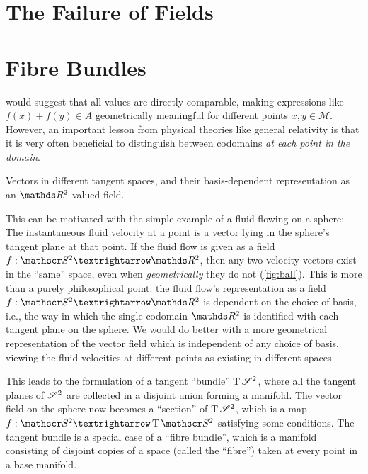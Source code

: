 \chapter{The Failure of Fields}







\chapter{Fibre Bundles}
\label{cha:fibre-bundles}

 would suggest that all values are directly comparable, making expressions like $f(x) + f(y) ∈ A$ geometrically meaningful for different points $x,y ∈ ℳ$.
However, an important lesson from physical theories like general relativity is that it is very often beneficial to distinguish between codomains \emph{at each point in the domain}.

\begin{marginfigure}
	\centering
	\caption{
		Vectors in different tangent spaces, and their basis-dependent representation as an $\RR^2$-valued field.
	}
	\label{fig:ball}
\end{marginfigure}

This can be motivated with the simple example of a fluid flowing on a sphere:
The instantaneous fluid velocity at a point is a vector lying in the sphere's tangent plane at that point.
If the fluid flow is given as a field $f : \Sphere^2 → \RR^2$, then any two velocity vectors exist in the ``same'' space, even when \emph{geometrically} they do not (\cref{fig:ball}).
This is more than a purely philosophical point: the fluid flow's representation as a field $f : \Sphere^2 → \RR^2$ is dependent on the choice of basis, i.e., the way in which the single codomain $\RR^2$ is identified with each tangent plane on the sphere.
We would do better with a more geometrical representation of the vector field which is independent of any choice of basis, viewing the fluid velocities at different points as existing in different spaces.

This leads to the formulation of a tangent ``bundle'' $\operatorname{T} \mathscr{S}^2$, where all the tangent planes of $\mathscr{S}^2$ are collected in a disjoint union forming a manifold.
The vector field on the sphere now becomes a ``section'' of $\operatorname{T} \mathscr{S}^2$, which is a map $f : \Sphere^2 → \TT \Sphere^2$ satisfying some conditions.
The tangent bundle is a special case of a ``fibre bundle'', which is a manifold consisting of disjoint copies of a space (called the ``fibre'') taken at every point in a base manifold.


